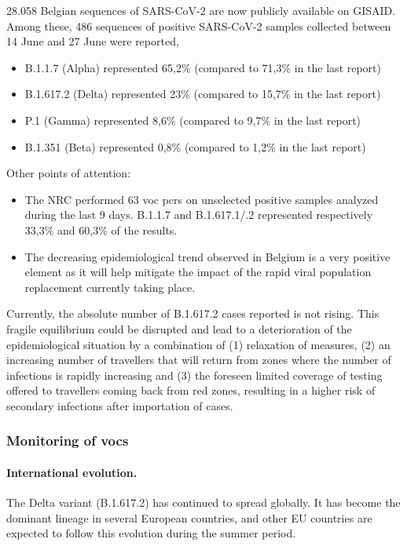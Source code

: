 28.058 Belgian sequences of SARS-CoV-2 are now publicly available on GISAID.
Among these, 486 sequences of positive SARS-CoV-2 samples collected between 14 June and 27 June were reported,
\begin{itemize}
  \item B.1.1.7 (Alpha) represented 65,2\% (compared to 71,3\% in the last report)
  \item B.1.617.2 (Delta) represented 23\% (compared to 15,7\% in the last report)
  \item P.1 (Gamma) represented 8,6\% (compared to 9,7\% in the last report)
  \item B.1.351 (Beta) represented 0,8\% (compared to 1,2\% in the last report)
\end{itemize}

Other points of attention:
\begin{itemize}
  \item The NRC performed 63 \gls{voc} \gls{pcr}s on unselected positive samples analyzed during the last 9 days.
B.1.1.7 and B.1.617.1/.2 represented respectively 33,3\% and 60,3\% of the results.
  \item The decreasing epidemiological trend observed in Belgium is a very positive element as it will help
mitigate the impact of the rapid viral population replacement currently taking place.
\end{itemize}

Currently, the absolute number of B.1.617.2 cases reported is not rising.
This fragile equilibrium could be disrupted and lead to a deterioration of the epidemiological situation by a combination of (1) relaxation of measures, (2) an increasing number of travellers that will return from zones where the number of infections is rapidly increasing and (3) the foreseen limited coverage of testing offered to travellers coming back from red zones, resulting in a higher risk of secondary infections after importation of cases.

\subsubsection{Monitoring of \gls{voc}s}
\paragraph*{International evolution.}
The Delta variant (B.1.617.2) has continued to spread globally.
It has become the dominant lineage in several European countries, and other EU countries are expected to follow this evolution during the summer period.

